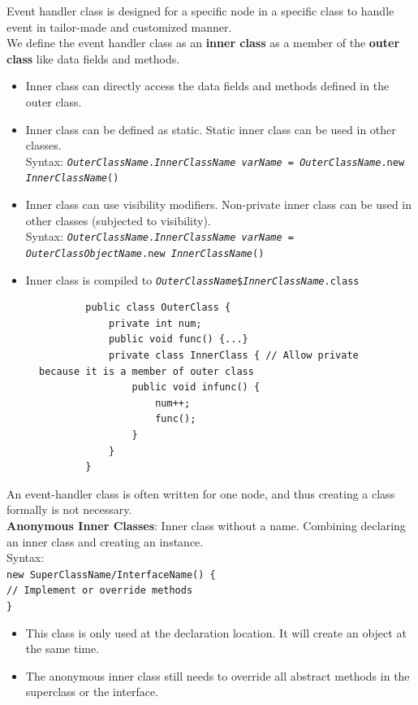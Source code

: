 \documentclass{article}
\begin{document}
Event handler class is designed for a specific node in a specific class to handle event in tailor-made and customized manner.\\
We define the event handler class as an \textbf{inner class} as a member of the \textbf{outer class} like data fields and methods.
\begin{itemize}
	\item Inner class can directly access the data fields and methods defined in the outer class.
	\item Inner class can be defined as static. Static inner class can be used in other classes.\\
	Syntax: \texttt{\textit{OuterClassName}.\textit{InnerClassName} \textit{varName} = \textit{OuterClassName}.new \textit{InnerClassName}()}
	\item Inner class can use visibility modifiers. Non-private inner class can be used in other classes (subjected to visibility).\\
	Syntax: \texttt{\textit{OuterClassName}.\textit{InnerClassName} \textit{varName} = \textit{OuterClassObjectName}.new \textit{InnerClassName}()}
	\item Inner class is compiled to \texttt{\textit{OuterClassName}\$\textit{InnerClassName}.class}
\end{itemize}

\begin{figure}[h]
	\begin{verbatim}
		public class OuterClass {
		    private int num;
		    public void func() {...}
		    private class InnerClass { // Allow private because it is a member of outer class
		        public void infunc() {
		            num++;
		            func();
		        }
		    }
		}
	\end{verbatim}
\end{figure}

An event-handler class is often written for one node, and thus creating a class formally is not necessary.\\
\textbf{Anonymous Inner Classes}: Inner class without a name. Combining declaring an inner class and creating an instance.\\
Syntax:\\
\texttt{new \texttt{SuperClassName/InterfaceName}() \{\\
\hspace*{2em}// Implement or override methods\\
\}}
\begin{itemize}
	\item This class is only used at the declaration location. It will create an object at the same time.
	\item The anonymous inner class still needs to override all abstract methods in the superclass or the interface.
\end{itemize}
\end{document}
